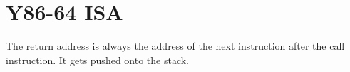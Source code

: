 \setcounter{chapter}{4}
\chapter{Y86-64 ISA}
The return address is always the address of the next instruction after the call instruction. It gets pushed onto the stack.
